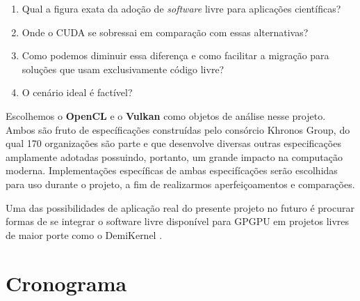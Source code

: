\documentclass[10pt, a4paper, conference, onecolumn]{IEEEtran}
\begin{document}
\begin{enumerate}
    \item\label{obj1} Qual a figura exata da adoção de \textit{software} livre para aplicações científicas?
    \item\label{obj2} Onde o CUDA se sobressai em comparação com essas alternativas?
    \item\label{obj3} Como podemos diminuir essa diferença e como facilitar a migração para soluções que usam exclusivamente código livre?
    \item\label{obj4} O cenário ideal é factível?
\end{enumerate}

Escolhemos o \textbf{OpenCL} e o \textbf{Vulkan} como objetos de análise nesse
projeto.
Ambos são fruto de específicações construídas pelo consórcio Khronos Group, do
qual 170 organizações são parte e que desenvolve diversas outras especificações
amplamente adotadas possuindo, portanto, um grande impacto na computação
moderna.
Implementações específicas de ambas especifícações serão escolhidas para uso
durante o projeto, a fim de realizarmos aperfeiçoamentos e comparações.

Uma das possibilidades de aplicação real do presente projeto no futuro é
procurar formas de se integrar o software livre disponível para GPGPU em
projetos livres de maior porte como o DemiKernel \cite{zhang2019m, zhang2021demikernel}.

\section{Cronograma}
\end{document}
